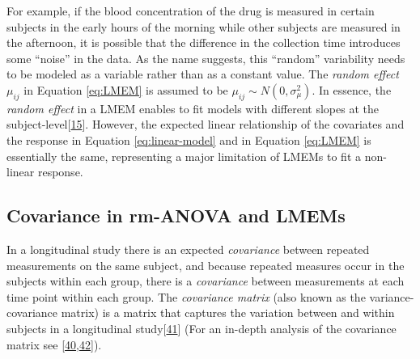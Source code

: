 \documentclass[
]{article}
\begin{document}
For example, if the blood concentration of the drug is measured in certain subjects in the early hours of the morning while other subjects are measured in the afternoon, it is possible that the difference in the collection time introduces some ``noise'' in the data. As the name suggests, this ``random'' variability needs to be modeled as a variable rather than as a constant value. The \emph{random effect} \(\mu_{ij}\) in Equation \eqref{eq:LMEM} is assumed to be \(\mu_{ij} \sim N(0,\sigma^2_\mu)\). In essence, the \emph{random effect} in a LMEM enables to fit models with different slopes at the subject-level{[}\protect\hyperlink{ref-pinheiro2006}{15}{]}. However, the expected linear relationship of the covariates and the response in Equation \eqref{eq:linear-model} and in Equation \eqref{eq:LMEM} is essentially the same, representing a major limitation of LMEMs to fit a non-linear response.

\hypertarget{covariance-in-rm-anova-and-lmems}{%
\subsection{Covariance in rm-ANOVA and LMEMs}\label{covariance-in-rm-anova-and-lmems}}

In a longitudinal study there is an expected \emph{covariance} between repeated measurements on the same subject, and because repeated measures occur in the subjects within each group, there is a \emph{covariance} between measurements at each time point within each group. The \emph{covariance matrix} (also known as the variance-covariance matrix) is a matrix that captures the variation between and within subjects in a longitudinal study{[}\protect\hyperlink{ref-wolfinger1996}{41}{]} (For an in-depth analysis of the covariance matrix see {[}\protect\hyperlink{ref-west2014}{40},\protect\hyperlink{ref-weiss2005}{42}{]}).
\end{document}
